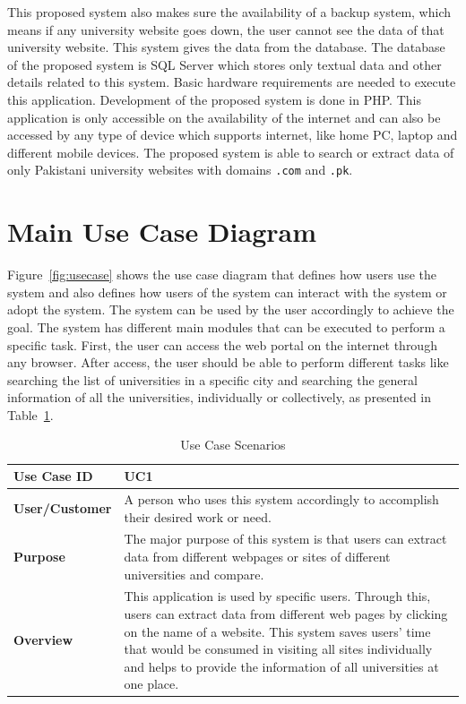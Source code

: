 This proposed system also makes sure the availability of a backup system, which means if any university website goes down, the user cannot see the data of that university website. This system gives the data from the database. The database of the proposed system is SQL Server which stores only textual data and other details related to this system. Basic hardware requirements are needed to execute this application. Development of the proposed system is done in PHP. This application is only accessible on the availability of the internet and can also be accessed by any type of device which supports internet, like home PC, laptop and different mobile devices. The proposed system is able to search or extract data of only Pakistani university websites with domains \texttt{.com} and \texttt{.pk}.

\section{Main Use Case Diagram}

Figure~\ref{fig:usecase} shows the use case diagram that defines how users use the system and also defines how users of the system can interact with the system or adopt the system. The system can be used by the user accordingly to achieve the goal. The system has different main modules that can be executed to perform a specific task. First, the user can access the web portal on the internet through any browser. After access, the user should be able to perform different tasks like searching the list of universities in a specific city and searching the general information of all the universities, individually or collectively, as presented in Table~\ref{tab:usecase}.

\begin{table}[H]
\centering
\caption{Use Case Scenarios}
\label{tab:usecase}
\begin{tabularx}{\textwidth}{|l|X|}
\hline
\textbf{Use Case ID} & UC1 \\
\hline
\textbf{User/Customer} & A person who uses this system accordingly to accomplish their desired work or need. \\
\hline
\textbf{Purpose} & The major purpose of this system is that users can extract data from different webpages or sites of different universities and compare. \\
\hline
\textbf{Overview} & This application is used by specific users. Through this, users can extract data from different web pages by clicking on the name of a website. This system saves users' time that would be consumed in visiting all sites individually and helps to provide the information of all universities at one place. \\
\hline
\end{tabularx}
\end{table}

